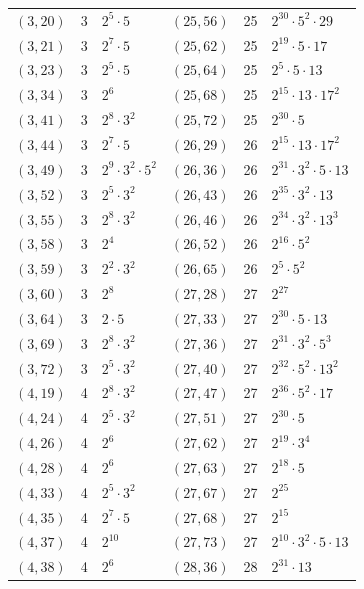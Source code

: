 \documentclass[11pt]{article}
\begin{document}
\begin{longtable}{@{}lrl@{\qquad}lrl@{}}
$(3,20)$ & 3 & $2^{5}\cdot 5$ & $(25,56)$ & 25 & $2^{30}\cdot 5^{2}\cdot 29$\\
$(3,21)$ & 3 & $2^{7}\cdot 5$ & $(25,62)$ & 25 & $2^{19}\cdot 5\cdot 17$\\
$(3,23)$ & 3 & $2^{5}\cdot 5$ & $(25,64)$ & 25 & $2^{5}\cdot 5\cdot 13$\\
$(3,34)$ & 3 & $2^{6}$ & $(25,68)$ & 25 & $2^{15}\cdot 13\cdot 17^{2}$\\
$(3,41)$ & 3 & $2^{8}\cdot 3^{2}$ & $(25,72)$ & 25 & $2^{30}\cdot 5$\\
$(3,44)$ & 3 & $2^{7}\cdot 5$ & $(26,29)$ & 26 & $2^{15}\cdot 13\cdot 17^{2}$\\
$(3,49)$ & 3 & $2^{9}\cdot 3^{2}\cdot 5^{2}$ & $(26,36)$ & 26 & $2^{31}\cdot 3^{2}\cdot 5\cdot 13$\\
$(3,52)$ & 3 & $2^{5}\cdot 3^{2}$ & $(26,43)$ & 26 & $2^{35}\cdot 3^{2}\cdot 13$\\
$(3,55)$ & 3 & $2^{8}\cdot 3^{2}$ & $(26,46)$ & 26 & $2^{34}\cdot 3^{2}\cdot 13^{3}$\\
$(3,58)$ & 3 & $2^{4}$ & $(26,52)$ & 26 & $2^{16}\cdot 5^{2}$\\
$(3,59)$ & 3 & $2^{2}\cdot 3^{2}$ & $(26,65)$ & 26 & $2^{5}\cdot 5^{2}$\\
$(3,60)$ & 3 & $2^{8}$ & $(27,28)$ & 27 & $2^{27}$\\
$(3,64)$ & 3 & $2\cdot 5$ & $(27,33)$ & 27 & $2^{30}\cdot 5\cdot 13$\\
$(3,69)$ & 3 & $2^{8}\cdot 3^{2}$ & $(27,36)$ & 27 & $2^{31}\cdot 3^{2}\cdot 5^{3}$\\
$(3,72)$ & 3 & $2^{5}\cdot 3^{2}$ & $(27,40)$ & 27 & $2^{32}\cdot 5^{2}\cdot 13^{2}$\\
$(4,19)$ & 4 & $2^{8}\cdot 3^{2}$ & $(27,47)$ & 27 & $2^{36}\cdot 5^{2}\cdot 17$\\
$(4,24)$ & 4 & $2^{5}\cdot 3^{2}$ & $(27,51)$ & 27 & $2^{30}\cdot 5$\\
$(4,26)$ & 4 & $2^{6}$ & $(27,62)$ & 27 & $2^{19}\cdot 3^{4}$\\
$(4,28)$ & 4 & $2^{6}$ & $(27,63)$ & 27 & $2^{18}\cdot 5$\\
$(4,33)$ & 4 & $2^{5}\cdot 3^{2}$ & $(27,67)$ & 27 & $2^{25}$\\
$(4,35)$ & 4 & $2^{7}\cdot 5$ & $(27,68)$ & 27 & $2^{15}$\\
$(4,37)$ & 4 & $2^{10}$ & $(27,73)$ & 27 & $2^{10}\cdot 3^{2}\cdot 5\cdot 13$\\
$(4,38)$ & 4 & $2^{6}$ & $(28,36)$ & 28 & $2^{31}\cdot 13$\\

\end{longtable}
\end{document}
